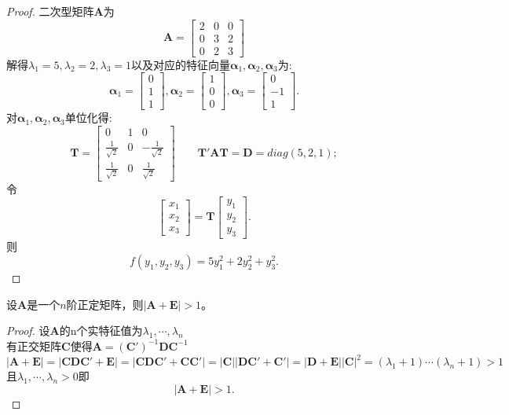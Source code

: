 \documentclass[lang=cn,11pt,normal]{elegantbook}
\begin{document}
	\begin{proof}
		二次型矩阵$\boldsymbol{A}$为
		$$
		\boldsymbol{A}=
		\begin{bmatrix}
		2&0&0\\
		0&3&2\\
		0&2&3
		\end{bmatrix}
		$$
		解得$\lambda_1=5,\lambda_2=2,\lambda_3=1$以及对应的特征向量$\boldsymbol{\alpha}_1,\boldsymbol{\alpha}_2,\boldsymbol{\alpha}_3$为:
		$$
		\boldsymbol{\alpha}_1=
		\begin{bmatrix}
		0\\1\\1
		\end{bmatrix},
		\boldsymbol{\alpha}_2=
		\begin{bmatrix}
		1\\0\\0
		\end{bmatrix},
		\boldsymbol{\alpha}_3=
		\begin{bmatrix}
		0\\-1\\1
		\end{bmatrix}.
		$$
		对$\boldsymbol{\alpha}_1,\boldsymbol{\alpha}_2,\boldsymbol{\alpha}_3$单位化得:
		$$
		\boldsymbol{T}=
		\begin{bmatrix}
		0&1&0\\
		\frac{1}{\sqrt{2}}&0&-\frac{1}{\sqrt{2}}\\
		\frac{1}{\sqrt{2}}&0&\frac{1}{\sqrt{2}}
		\end{bmatrix}
		\qquad\boldsymbol{T}'\boldsymbol{AT}=\boldsymbol{D}=diag(5,2,1);
		$$
		令
		$$
		\begin{bmatrix}
		x_1\\x_2\\x_3
		\end{bmatrix}
		=
		\boldsymbol{T}
		\begin{bmatrix}
		y_1\\y_2\\y_3
		\end{bmatrix}.
		$$
		则
		$$f(y_1,y_2,y_3)=5y_1^2+2y_2^2+y_3^2.$$
	\end{proof}
	\begin{exercise}
		设$\boldsymbol{A}$是一个$n$阶正定矩阵，则$|\boldsymbol{A}+\boldsymbol{E}|>1$。
	\end{exercise}
	\begin{proof}
		设$\boldsymbol{A}$的n个实特征值为$\lambda_1,\cdots,\lambda_n$
		\\有正交矩阵$\boldsymbol{C}$使得$\boldsymbol{A}=(\boldsymbol{C}')^{-1}\boldsymbol{D}\boldsymbol{C}^{-1}$
		$$
		|\boldsymbol{A}+\boldsymbol{E}|=|\boldsymbol{CDC}'+\boldsymbol{E}|=|\boldsymbol{CDC}'+\boldsymbol{CC}'|=|\boldsymbol{C}||\boldsymbol{DC}'+\boldsymbol{C}'|=|\boldsymbol{D}+\boldsymbol{E}||\boldsymbol{C}|^2=(\lambda_1+1)\cdots(\lambda_n+1)>1
		$$
		且$\lambda_1,\cdots,\lambda_n>0$即
		$$
		|\boldsymbol{A}+\boldsymbol{E}|>1.
		$$
	\end{proof}
\end{document}
